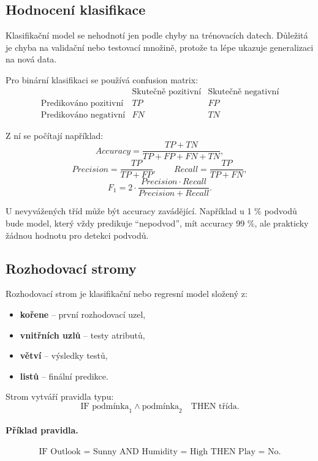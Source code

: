 \subsection{Hodnocení klasifikace}

Klasifikační model se nehodnotí jen podle chyby na trénovacích datech. Důležitá je chyba na validační nebo
testovací množině, protože ta lépe ukazuje generalizaci na nová data.

Pro binární klasifikaci se používá confusion matrix:
\[
\begin{array}{c|cc}
 & \text{Skutečně pozitivní} & \text{Skutečně negativní}\\
\hline
\text{Predikováno pozitivní} & TP & FP\\
\text{Predikováno negativní} & FN & TN
\end{array}
\]

Z ní se počítají například:
\[
Accuracy=\frac{TP+TN}{TP+FP+FN+TN},
\]
\[
Precision=\frac{TP}{TP+FP},
\qquad
Recall=\frac{TP}{TP+FN},
\]
\[
F_1=
2\cdot
\frac{Precision\cdot Recall}{Precision+Recall}.
\]

U nevyvážených tříd může být accuracy zavádějící. Například u 1 \% podvodů bude model, který vždy predikuje
``nepodvod'', mít accuracy 99 \%, ale prakticky žádnou hodnotu pro detekci podvodů.

\subsection{Rozhodovací stromy}

Rozhodovací strom je klasifikační nebo regresní model složený z:
\begin{itemize}
    \item \textbf{kořene} -- první rozhodovací uzel,
    \item \textbf{vnitřních uzlů} -- testy atributů,
    \item \textbf{větví} -- výsledky testů,
    \item \textbf{listů} -- finální predikce.
\end{itemize}

Strom vytváří pravidla typu:
\[
\text{IF podmínka}_1 \wedge \text{podmínka}_2
\quad
\text{THEN třída}.
\]

\paragraph{Příklad pravidla.}
\[
\text{IF Outlook = Sunny AND Humidity = High THEN Play = No.}
\]

